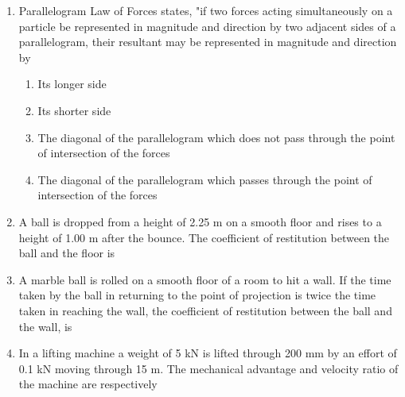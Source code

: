 \documentclass[11pt,a4paper]{article}
\begin{document}
\begin{enumerate}
\item{Parallelogram Law of Forces states, "if two forces acting simultaneously on a particle be represented in magnitude and direction by two adjacent sides of a parallelogram, their resultant may be represented in magnitude and direction by}
\begin{enumerate}[label=\Alph*.]
\item{Its longer side}
\item{Its shorter side}
\item{The diagonal of the parallelogram which does not pass through the point of intersection of the forces}
\item{The diagonal of the parallelogram which passes through the point of intersection of the forces}
\end{enumerate}
\item{A ball is dropped from a height of 2.25 m on a smooth floor and rises to a height of 1.00 m after the bounce. The coefficient of restitution between the ball and the floor is}
\\
\item{A marble ball is rolled on a smooth floor of a room to hit a wall. If the time taken by the ball in returning to the point of projection is twice the time taken in reaching the wall, the coefficient of restitution between the ball and the wall, is}
\\
\item{In a lifting machine a weight of 5 kN is lifted through 200 mm by an effort of 0.1 kN moving through 15 m. The mechanical advantage and velocity ratio of the machine are respectively}

\end{enumerate}
\end{document}
